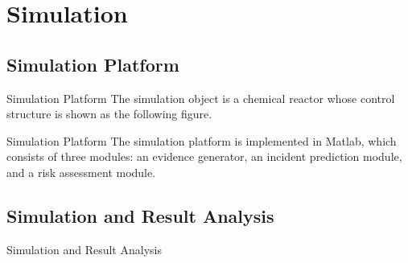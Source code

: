 \section{Simulation}
\subsection{Simulation Platform}
\begin{frame}{Simulation Platform}
    The simulation object is a chemical reactor whose control structure is shown as the following figure.\\[-10pt]
    \begin{center}
      
    \end{center}
\end{frame}

\begin{frame}{Simulation Platform}
    The simulation platform is implemented in Matlab, which consists of three modules: an evidence generator, an incident prediction module, and a risk assessment module.
    \begin{center}
      
    \end{center}
\end{frame}



\subsection{Simulation and Result Analysis}
\begin{frame}{Simulation and Result Analysis}
\end{frame} 